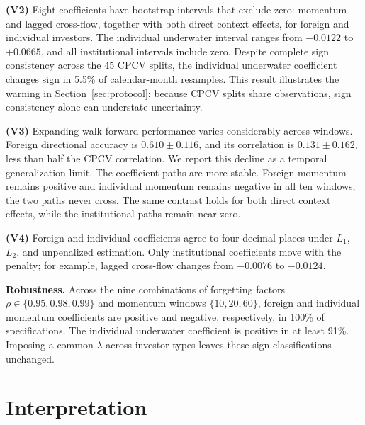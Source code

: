 \textbf{(V2)} Eight coefficients have bootstrap intervals that exclude zero: momentum and
lagged cross-flow, together with both direct context effects, for foreign and individual
investors. The individual underwater interval ranges from $-0.0122$ to $+0.0665$, and all
institutional intervals include zero. Despite complete sign consistency across the 45 CPCV splits, the
individual underwater coefficient changes sign in 5.5\% of calendar-month resamples. This
result illustrates the warning in Section~\ref{sec:protocol}: because CPCV splits share
observations, sign consistency alone can understate uncertainty.

\textbf{(V3)} Expanding walk-forward performance varies considerably across windows.
Foreign directional accuracy is $0.610\pm0.116$, and its correlation is
$0.131\pm0.162$, less than half the CPCV correlation. We report this decline as a temporal
generalization limit. The coefficient paths are more stable. Foreign momentum remains
positive and individual momentum remains negative in all ten windows; the two paths never
cross. The same contrast holds for both direct context effects, while the institutional
paths remain near zero.

\textbf{(V4)} Foreign and individual coefficients agree to four decimal places under
$L_1$, $L_2$, and unpenalized estimation. Only institutional coefficients move with the
penalty; for example, lagged cross-flow changes from $-0.0076$ to $-0.0124$.

\textbf{Robustness.} Across the nine combinations of forgetting factors
$\rho\in\{0.95,0.98,0.99\}$ and momentum windows $\{10,20,60\}$, foreign and individual
momentum coefficients are positive and negative, respectively, in 100\% of specifications.
The individual underwater coefficient is positive in at least 91\%. Imposing a common
$\lambda$ across investor types leaves these sign classifications unchanged.

\section{Interpretation}
\label{sec:interpretation}

